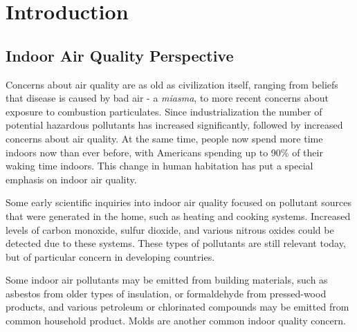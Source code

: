 \documentclass[../thesis.tex]{subfiles}
\begin{document}
\begin{comment}
What do I want people to know after reading this?

* Modeling is useful because it allows us to understand the physical causes of VI in great detail. It also lets use explore different scenarios.

* Some basic background about VI, such as a brief history of it and indoor air quality (Radon etc).

* What are the current hot topics in VI?
- ITS
- CPM

* Why is temporal and spatial variability a problem in VI? 
\end{comment}

\chapter{Introduction}


\section{Indoor Air Quality Perspective}

Concerns about air quality are as old as civilization itself, ranging from beliefs that disease is caused by bad air - a \textit{miasma}, to more recent concerns about exposure to combustion particulates.
Since industrialization the number of potential hazardous pollutants has increased significantly, followed by increased concerns about air quality.
At the same time, people now spend more time indoors now than ever before, with Americans spending up to 90\% of their waking time indoors\cite{klepeis_national_2001}.
This change in human habitation has put a special emphasis on indoor air quality.

Some early scientific inquiries into indoor air quality focused on pollutant sources that were generated in the home, such as heating and cooking systems.
Increased levels of carbon monoxide, sulfur dioxide, and various nitrous oxides could be detected due to these systems\cite{craig_d._hollowell_combustion-generated_1976}.
These types of pollutants are still relevant today, but of particular concern in developing countries\cite{world_health_organisation_who_2014}.

Some indoor air pollutants may be emitted from building materials, such as asbestos from older types of insulation, or formaldehyde from pressed-wood products, and various petroleum or chlorinated compounds may be emitted from common household product. %
Molds are another common indoor quality concern\cite{world_health_organisation_who_2009}.
\end{document}
